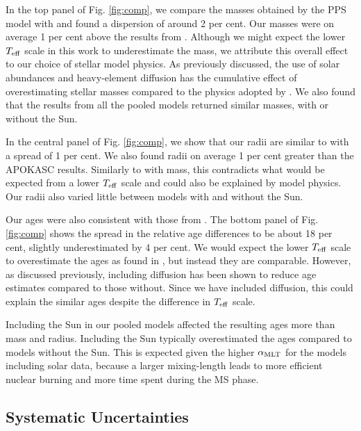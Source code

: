 In the top panel of Fig. \ref{fig:comp}, we compare the masses obtained by the PPS model with  and found a dispersion of around 2 per cent. Our masses were on average 1 per cent above the results from . Although we might expect the lower ${T_\mathrm{eff}}$ scale in this work to underestimate the mass, we attribute this overall effect to our choice of stellar model physics. As previously discussed, the use of \citet{Asplund.Grevesse.ea2009} solar abundances and heavy-element diffusion has the cumulative effect of overestimating stellar masses compared to the physics adopted by . We also found that the results from all the pooled models returned similar masses, with or without the Sun.

In the central panel of Fig. \ref{fig:comp}, we show that our radii are similar to  with a spread of 1 per cent. We also found radii on average 1 per cent greater than the APOKASC results. Similarly to with mass, this contradicts what would be expected from a lower ${T_\mathrm{eff}}$ scale and could also be explained by model physics. Our radii also varied little between models with and without the Sun.

Our ages were also consistent with those from . The bottom panel of Fig. \ref{fig:comp} shows the spread in the relative age differences to be about 18 per cent, slightly underestimated by 4 per cent. We would expect the lower ${T_\mathrm{eff}}$ scale to overestimate the ages as found in , but instead they are comparable. However, as discussed previously, including diffusion has been shown to reduce age estimates compared to those without. Since we have included diffusion, this could explain the similar ages despite the difference in ${T_\mathrm{eff}}$ scale.

Including the Sun in our pooled models affected the resulting ages more than mass and radius. Including the Sun typically overestimated the ages compared to models without the Sun. This is expected given the higher ${\alpha_\mathrm{MLT}}$ for the models including solar data, because a larger mixing-length leads to more efficient nuclear burning and more time spent during the MS phase. 

\subsection{Systematic Uncertainties}\label{sec:sys}

